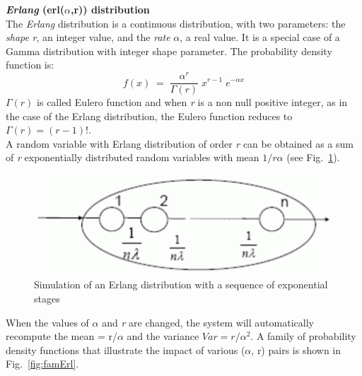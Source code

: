\textbf{\emph{Erlang} (erl($\alpha$,r)) distribution}\\
The \emph{Erlang} distribution is a continuous distribution, with
two parameters: the \emph{shape} \emph{r}, an integer value, and the
\emph{rate}
$\alpha$, a real value. It is a special case of a Gamma
distribution with integer shape parameter. The probability density
function is:
\[
f(x)\; = \; \frac{\alpha^r}{\Gamma(r)} \; x^{r-1} \; e^{-\alpha x}
\]
$\Gamma(r)$ is called Eulero function and when \emph{r} is a non
null positive integer, as in the case of the Erlang distribution,
the Eulero function reduces to $\Gamma(r)= (r-1)!$.\\
A random variable with Erlang distribution of order \emph{r} can
be obtained as a sum of \emph{r} exponentially distributed random
variables with mean $1/r \alpha$ (see Fig.~\ref{fig:simErl}).
\begin{figure}[htb]
    \begin{center}
        \includegraphics[scale=.5]{img/jsimg/4.3.eps}
    \end{center}
    \caption{Simulation of an Erlang distribution with a sequence of exponential stages}
    \label{fig:simErl}
\end{figure}
When the values of $\alpha$ and \emph{r} are changed, the system
will automatically recompute the mean = r/$\alpha$ and the
variance $Var = r/\alpha^2$. A family of probability density
functions that illustrate the impact of various ($\alpha$, r)
pairs is shown in Fig.~\ref{fig:famErl}.
